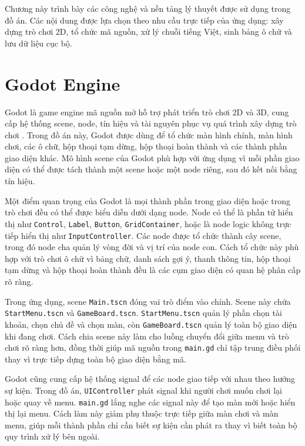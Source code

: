 \documentclass[../DoAn.tex]{subfiles}
\begin{document}
Chương này trình bày các công nghệ và nền tảng lý thuyết được sử dụng trong đồ án. Các nội dung được lựa chọn theo nhu cầu trực tiếp của ứng dụng: xây dựng trò chơi 2D, tổ chức mã nguồn, xử lý chuỗi tiếng Việt, sinh bảng ô chữ và lưu dữ liệu cục bộ.

\section{Godot Engine}
Godot là game engine mã nguồn mở hỗ trợ phát triển trò chơi 2D và 3D, cung cấp hệ thống scene, node, tín hiệu và tài nguyên phục vụ quá trình xây dựng trò chơi \cite{godotDocs}. Trong đồ án này, Godot được dùng để tổ chức màn hình chính, màn hình chơi, các ô chữ, hộp thoại tạm dừng, hộp thoại hoàn thành và các thành phần giao diện khác. Mô hình scene của Godot phù hợp với ứng dụng vì mỗi phần giao diện có thể được tách thành một scene hoặc một node riêng, sau đó kết nối bằng tín hiệu.

Một điểm quan trọng của Godot là mọi thành phần trong giao diện hoặc trong trò chơi đều có thể được biểu diễn dưới dạng node. Node có thể là phần tử hiển thị như \texttt{Control}, \texttt{Label}, \texttt{Button}, \texttt{GridContainer}, hoặc là node logic không trực tiếp hiển thị như \texttt{InputController}. Các node được tổ chức thành cây scene, trong đó node cha quản lý vòng đời và vị trí của node con. Cách tổ chức này phù hợp với trò chơi ô chữ vì bảng chữ, danh sách gợi ý, thanh thông tin, hộp thoại tạm dừng và hộp thoại hoàn thành đều là các cụm giao diện có quan hệ phân cấp rõ ràng.

Trong ứng dụng, scene \texttt{Main.tscn} đóng vai trò điểm vào chính. Scene này chứa \texttt{StartMenu.tscn} và \texttt{GameBoard.tscn}. \texttt{StartMenu.tscn} quản lý phần chọn tài khoản, chọn chủ đề và chọn màn, còn \texttt{GameBoard.tscn} quản lý toàn bộ giao diện khi đang chơi. Cách chia scene này làm cho luồng chuyển đổi giữa menu và trò chơi rõ ràng hơn, đồng thời giúp mã nguồn trong \texttt{main.gd} chỉ tập trung điều phối thay vì trực tiếp dựng toàn bộ giao diện bằng mã.

Godot cũng cung cấp hệ thống signal để các node giao tiếp với nhau theo hướng sự kiện. Trong đồ án, \texttt{UIController} phát signal khi người chơi muốn chơi lại hoặc quay về menu. \texttt{main.gd} lắng nghe các signal này để tạo màn mới hoặc hiển thị lại menu. Cách làm này giảm phụ thuộc trực tiếp giữa màn chơi và màn menu, giúp mỗi thành phần chỉ cần biết sự kiện cần phát ra thay vì biết toàn bộ quy trình xử lý bên ngoài.
\end{document}
